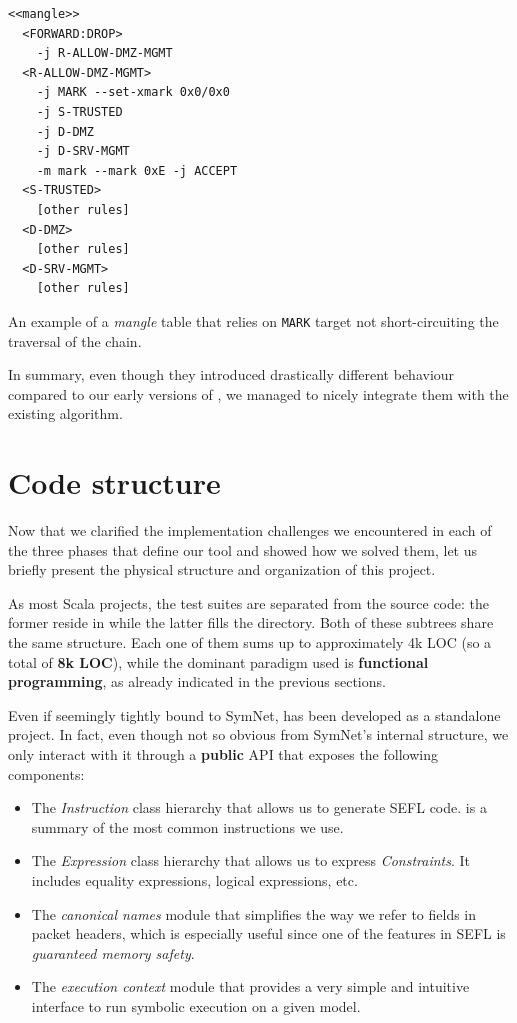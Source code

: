 {\begin{listing}
  \lstset{numbers=none, frame=single, basicstyle=\ttfamily,
    xleftmargin=0.25\textwidth, xrightmargin=0.25\textwidth
  }
  \small
  \begin{lstlisting}
<<mangle>>
  <FORWARD:DROP>
    -j R-ALLOW-DMZ-MGMT
  <R-ALLOW-DMZ-MGMT>
    -j MARK --set-xmark 0x0/0x0
    -j S-TRUSTED
    -j D-DMZ
    -j D-SRV-MGMT
    -m mark --mark 0xE -j ACCEPT
  <S-TRUSTED>
    [other rules]
  <D-DMZ>
    [other rules]
  <D-SRV-MGMT>
    [other rules]
  \end{lstlisting}
  \caption{An example of a \emph{mangle} table that relies on \texttt{MARK}
  target not short-circuiting the traversal of the chain.}
  \label{lst:using-mark}
\end{listing}

In summary, even though they introduced drastically different behaviour
compared to our early versions of \TOOL, we managed to nicely integrate them
with the existing algorithm.


\section{Code structure}

Now that we clarified the implementation challenges we encountered in each of
the three phases that define our tool and showed how we solved them, let us
briefly present the physical structure and organization of this project.

As most Scala projects, the test suites are separated from the source code: the
former reside in  while the latter fills the 
directory.  Both of these subtrees share the same structure.  Each one of them
sums up to approximately 4k LOC (so a total of \textbf{8k LOC}), while the
dominant paradigm used is \textbf{functional programming}, as already indicated
in the previous sections.

Even if seemingly tightly bound to SymNet, \TOOL has been developed as a
standalone project.  In fact, even though not so obvious from SymNet's internal
structure, we only interact with it through a \textbf{public}
API that exposes the following
components:
\begin{itemize}
  \item The \emph{Instruction} class hierarchy that allows us to generate SEFL
    code.   is a summary of the most
    common instructions we use.
  \item The \emph{Expression} class hierarchy that allows us to express
    \emph{Constraints}.  It includes equality expressions, logical expressions,
    etc.
  \item The \emph{canonical names} module that simplifies the way we refer to
    fields in packet headers, which is especially useful since one of the
    features in SEFL is \emph{guaranteed memory safety}.
  \item The \emph{execution context} module that provides a very simple and
    intuitive interface to run symbolic execution on a given model.
\end{itemize}

}
